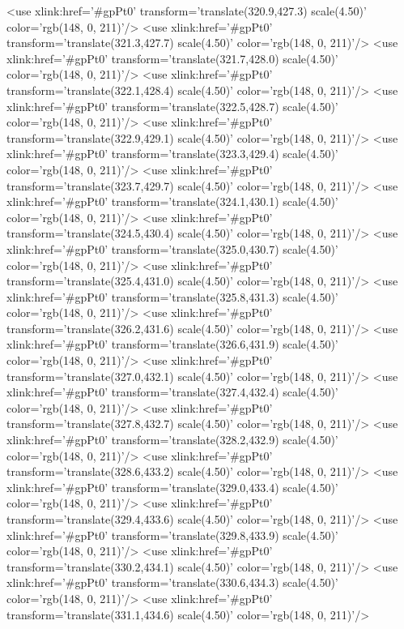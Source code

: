 	<use xlink:href='#gpPt0' transform='translate(320.9,427.3) scale(4.50)' color='rgb(148,   0, 211)'/>
	<use xlink:href='#gpPt0' transform='translate(321.3,427.7) scale(4.50)' color='rgb(148,   0, 211)'/>
	<use xlink:href='#gpPt0' transform='translate(321.7,428.0) scale(4.50)' color='rgb(148,   0, 211)'/>
	<use xlink:href='#gpPt0' transform='translate(322.1,428.4) scale(4.50)' color='rgb(148,   0, 211)'/>
	<use xlink:href='#gpPt0' transform='translate(322.5,428.7) scale(4.50)' color='rgb(148,   0, 211)'/>
	<use xlink:href='#gpPt0' transform='translate(322.9,429.1) scale(4.50)' color='rgb(148,   0, 211)'/>
	<use xlink:href='#gpPt0' transform='translate(323.3,429.4) scale(4.50)' color='rgb(148,   0, 211)'/>
	<use xlink:href='#gpPt0' transform='translate(323.7,429.7) scale(4.50)' color='rgb(148,   0, 211)'/>
	<use xlink:href='#gpPt0' transform='translate(324.1,430.1) scale(4.50)' color='rgb(148,   0, 211)'/>
	<use xlink:href='#gpPt0' transform='translate(324.5,430.4) scale(4.50)' color='rgb(148,   0, 211)'/>
	<use xlink:href='#gpPt0' transform='translate(325.0,430.7) scale(4.50)' color='rgb(148,   0, 211)'/>
	<use xlink:href='#gpPt0' transform='translate(325.4,431.0) scale(4.50)' color='rgb(148,   0, 211)'/>
	<use xlink:href='#gpPt0' transform='translate(325.8,431.3) scale(4.50)' color='rgb(148,   0, 211)'/>
	<use xlink:href='#gpPt0' transform='translate(326.2,431.6) scale(4.50)' color='rgb(148,   0, 211)'/>
	<use xlink:href='#gpPt0' transform='translate(326.6,431.9) scale(4.50)' color='rgb(148,   0, 211)'/>
	<use xlink:href='#gpPt0' transform='translate(327.0,432.1) scale(4.50)' color='rgb(148,   0, 211)'/>
	<use xlink:href='#gpPt0' transform='translate(327.4,432.4) scale(4.50)' color='rgb(148,   0, 211)'/>
	<use xlink:href='#gpPt0' transform='translate(327.8,432.7) scale(4.50)' color='rgb(148,   0, 211)'/>
	<use xlink:href='#gpPt0' transform='translate(328.2,432.9) scale(4.50)' color='rgb(148,   0, 211)'/>
	<use xlink:href='#gpPt0' transform='translate(328.6,433.2) scale(4.50)' color='rgb(148,   0, 211)'/>
	<use xlink:href='#gpPt0' transform='translate(329.0,433.4) scale(4.50)' color='rgb(148,   0, 211)'/>
	<use xlink:href='#gpPt0' transform='translate(329.4,433.6) scale(4.50)' color='rgb(148,   0, 211)'/>
	<use xlink:href='#gpPt0' transform='translate(329.8,433.9) scale(4.50)' color='rgb(148,   0, 211)'/>
	<use xlink:href='#gpPt0' transform='translate(330.2,434.1) scale(4.50)' color='rgb(148,   0, 211)'/>
	<use xlink:href='#gpPt0' transform='translate(330.6,434.3) scale(4.50)' color='rgb(148,   0, 211)'/>
	<use xlink:href='#gpPt0' transform='translate(331.1,434.6) scale(4.50)' color='rgb(148,   0, 211)'/>

